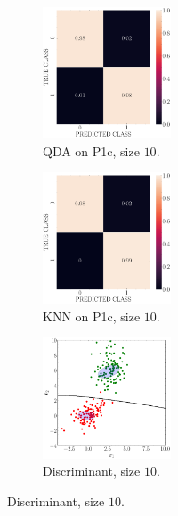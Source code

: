\documentclass[11pt, a4 paper]{article}
\begin{document}
\begin{figure}[!htbp]
\centering
    \begin{subfigure}[!htbp]{0.24\textwidth}
       \centering
       \includegraphics[width=1.5in]{../results/ex1/conf_mtx_QD_ML_dataset_P1c_size_10.pdf}
       \caption{QDA on P1c, size $10$.}
       \label{fig:QDA_P1c_10}
    \end{subfigure}
\quad
    \begin{subfigure}[!htbp]{0.24\textwidth}
       \centering
       \includegraphics[width=1.5in]{../results/ex1/conf_mtx_KNN_dataset_P1c_size_10.pdf}
       \caption{KNN on P1c, size $10$.}
       \label{fig:KNN_P1c_10}
    \end{subfigure}
\quad
    \begin{subfigure}[!htbp]{0.24\textwidth}
       \centering
       \includegraphics[width=1.5in]{../results/ex1/samples_QD_ML_dataset_P1c_size_10.pdf}
       \caption{Discriminant, size $10$.}
       \label{fig:KNN_P1c_10}
    \end{subfigure}
    

\end{figure}
\end{document}
